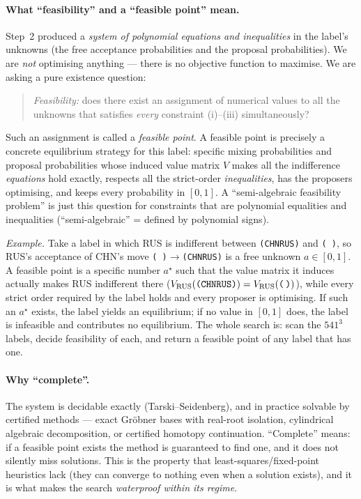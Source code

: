 \documentclass[11pt]{article}
\newcommand{\state}[1]{\texttt{(#1)}}
\newcommand{\empt}{\texttt{(\,)}}
\begin{document}
\paragraph{What ``feasibility'' and a ``feasible point'' mean.} Step~2 produced a
\emph{system of polynomial equations and inequalities} in the label's unknowns (the
free acceptance probabilities and the proposal probabilities). We are \emph{not}
optimising anything --- there is no objective function to maximise. We are asking a
pure existence question:
\begin{quote}
\emph{Feasibility:} does there exist an assignment of numerical values to all the
unknowns that satisfies \emph{every} constraint (i)--(iii) simultaneously?
\end{quote}
Such an assignment is called a \emph{feasible point}. A feasible point is precisely a
concrete equilibrium strategy for this label: specific mixing probabilities and
proposal probabilities whose induced value matrix $V$ makes all the indifference
\emph{equations} hold exactly, respects all the strict-order \emph{inequalities}, has
the proposers optimising, and keeps every probability in $[0,1]$. A ``semi-algebraic
feasibility problem'' is just this question for constraints that are polynomial
equalities and inequalities (``semi-algebraic'' = defined by polynomial signs).

\emph{Example.} Take a label in which RUS is indifferent between \state{CHNRUS} and
\empt, so RUS's acceptance of CHN's move \empt$\to$\state{CHNRUS} is a free unknown
$a\in[0,1]$. A feasible point is a specific number $a^\star$ such that the value
matrix it induces actually makes RUS indifferent there ($V_{\text{RUS}}(\state{CHNRUS})
=V_{\text{RUS}}(\empt)$), while every strict order required by the label holds and
every proposer is optimising. If such an $a^\star$ exists, the label yields an
equilibrium; if no value in $[0,1]$ does, the label is infeasible and contributes no
equilibrium. The whole search is: scan the $541^3$ labels, decide feasibility of
each, and return a feasible point of any label that has one.

\paragraph{Why ``complete''.} The system is decidable exactly (Tarski--Seidenberg),
and in practice solvable by certified methods --- exact Gr\"obner bases with
real-root isolation, cylindrical algebraic decomposition, or certified homotopy
continuation. ``Complete'' means: if a feasible point exists the method is guaranteed
to find one, and it does not silently miss solutions. This is the property that
least-squares/fixed-point heuristics lack (they can converge to nothing even when a
solution exists), and it is what makes the search \emph{waterproof within its
regime}.
\end{document}
